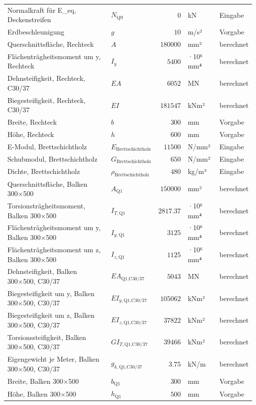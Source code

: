 \documentclass[11pt,a4paper]{article}
\begin{document}
\begin{xltabular}{\linewidth}{>{\raggedright\arraybackslash}Xlrll}
Normalkraft für E\_eq, Deckenstreifen & $N_{\text{Q9}}$ & $0$ & kN & Eingabe \\
Erdbeschleunigung & $g$ & $10$ & m/s² & Vorgabe \\
Querschnittsfläche, Rechteck & $A$ & $180000$ & mm² & berechnet \\
Flächenträgheitsmoment um y, Rechteck & $I_y$ & $5400$ & ·10⁶ mm⁴ & berechnet \\
Dehnsteifigkeit, Rechteck, C30/37 & $EA$ & $6052$ & MN & berechnet \\
Biegesteifigkeit, Rechteck, C30/37 & $EI$ & $181547$ & kNm² & berechnet \\
Breite, Rechteck & $b$ & $300$ & mm & Vorgabe \\
Höhe, Rechteck & $h$ & $600$ & mm & Vorgabe \\
E-Modul, Brettschichtholz & $E_{\text{Brettschichtholz}}$ & $11500$ & N/mm² & Eingabe \\
Schubmodul, Brettschichtholz & $G_{\text{Brettschichtholz}}$ & $650$ & N/mm² & Eingabe \\
Dichte, Brettschichtholz & $\rho_{\text{Brettschichtholz}}$ & $480$ & kg/m³ & Eingabe \\
Querschnittsfläche, Balken 300×500 & $A_{\text{Q1}}$ & $150000$ & mm² & berechnet \\
Torsionsträgheitsmoment, Balken 300×500 & $I_{T,\text{Q1}}$ & $2817.37$ & ·10⁶ mm⁴ & berechnet \\
Flächenträgheitsmoment um y, Balken 300×500 & $I_{y,\text{Q1}}$ & $3125$ & ·10⁶ mm⁴ & berechnet \\
Flächenträgheitsmoment um z, Balken 300×500 & $I_{z,\text{Q1}}$ & $1125$ & ·10⁶ mm⁴ & berechnet \\
Dehnsteifigkeit, Balken 300×500, C30/37 & $EA_{\text{Q1,C30/37}}$ & $5043$ & MN & berechnet \\
Biegesteifigkeit um y, Balken 300×500, C30/37 & $EI_{y,\text{Q1,C30/37}}$ & $105062$ & kNm² & berechnet \\
Biegesteifigkeit um z, Balken 300×500, C30/37 & $EI_{z,\text{Q1,C30/37}}$ & $37822$ & kNm² & berechnet \\
Torsionssteifigkeit, Balken 300×500, C30/37 & $GI_{T,\text{Q1,C30/37}}$ & $39466$ & kNm² & berechnet \\
Eigengewicht je Meter, Balken 300×500, C30/37 & $g_{k,\text{Q1,C30/37}}$ & $3.75$ & kN/m & berechnet \\
Breite, Balken 300×500 & $b_{\text{Q1}}$ & $300$ & mm & Vorgabe \\
Höhe, Balken 300×500 & $h_{\text{Q1}}$ & $500$ & mm & Vorgabe \\

\end{xltabular}
\end{document}

